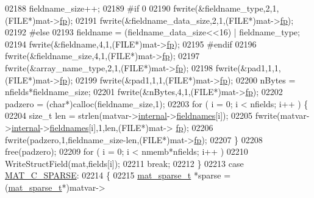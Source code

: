 \begin{DoxyCode}
{{{{{{{{{{{{{{{{02188                 fieldname\_size++;
02189 \textcolor{preprocessor}{#if 0}
02190             fwrite(&fieldname\_type,2,1,(FILE*)mat->\hyperlink{struct__mat__t_a85f562e407ca9ad4d2a6e14f839432b7}{fp});
02191             fwrite(&fieldname\_data\_size,2,1,(FILE*)mat->\hyperlink{struct__mat__t_a85f562e407ca9ad4d2a6e14f839432b7}{fp});
02192 \textcolor{preprocessor}{#else}
02193             fieldname = (fieldname\_data\_size<<16) | fieldname\_type;
02194             fwrite(&fieldname,4,1,(FILE*)mat->\hyperlink{struct__mat__t_a85f562e407ca9ad4d2a6e14f839432b7}{fp});
02195 \textcolor{preprocessor}{#endif}
02196             fwrite(&fieldname\_size,4,1,(FILE*)mat->\hyperlink{struct__mat__t_a85f562e407ca9ad4d2a6e14f839432b7}{fp});
02197             fwrite(&array\_name\_type,2,1,(FILE*)mat->\hyperlink{struct__mat__t_a85f562e407ca9ad4d2a6e14f839432b7}{fp});
02198             fwrite(&pad1,1,1,(FILE*)mat->\hyperlink{struct__mat__t_a85f562e407ca9ad4d2a6e14f839432b7}{fp});
02199             fwrite(&pad1,1,1,(FILE*)mat->\hyperlink{struct__mat__t_a85f562e407ca9ad4d2a6e14f839432b7}{fp});
02200             nBytes = nfields*fieldname\_size;
02201             fwrite(&nBytes,4,1,(FILE*)mat->\hyperlink{struct__mat__t_a85f562e407ca9ad4d2a6e14f839432b7}{fp});
02202             padzero = (\textcolor{keywordtype}{char}*)calloc(fieldname\_size,1);
02203             \textcolor{keywordflow}{for} ( i = 0; i < nfields; i++ ) \{
02204                 \textcolor{keywordtype}{size\_t} len = strlen(matvar->\hyperlink{group___m_a_t_a6e97e3ed9f40c49322c18561c2a94e92}{internal}->\hyperlink{structmatvar__internal_a7574d000bfc98ad4860ae6590b8d4985}{fieldnames}[i]);
02205                 fwrite(matvar->\hyperlink{group___m_a_t_a6e97e3ed9f40c49322c18561c2a94e92}{internal}->\hyperlink{structmatvar__internal_a7574d000bfc98ad4860ae6590b8d4985}{fieldnames}[i],1,len,(FILE*)mat->
      \hyperlink{struct__mat__t_a85f562e407ca9ad4d2a6e14f839432b7}{fp});
02206                 fwrite(padzero,1,fieldname\_size-len,(FILE*)mat->\hyperlink{struct__mat__t_a85f562e407ca9ad4d2a6e14f839432b7}{fp});
02207             \}
02208             free(padzero);
02209             \textcolor{keywordflow}{for} ( i = 0; i < nmemb*nfields; i++ )
02210                 WriteStructField(mat,fields[i]);
02211             \textcolor{keywordflow}{break};
02212         \}
02213         \textcolor{keywordflow}{case} \hyperlink{group___m_a_t_ggad4d60ae7b709fc81bfd744fb4c857c40a0d5655b7e6178a2242cb3bb56ff4c8d2}{MAT\_C\_SPARSE}:
02214         \{
02215             \hyperlink{group___m_a_t_structmat__sparse__t}{mat\_sparse\_t} *sparse = (\hyperlink{group___m_a_t_structmat__sparse__t}{mat\_sparse\_t}*)matvar->
}}}}}}}}}}}}}}}}
\end{DoxyCode}
